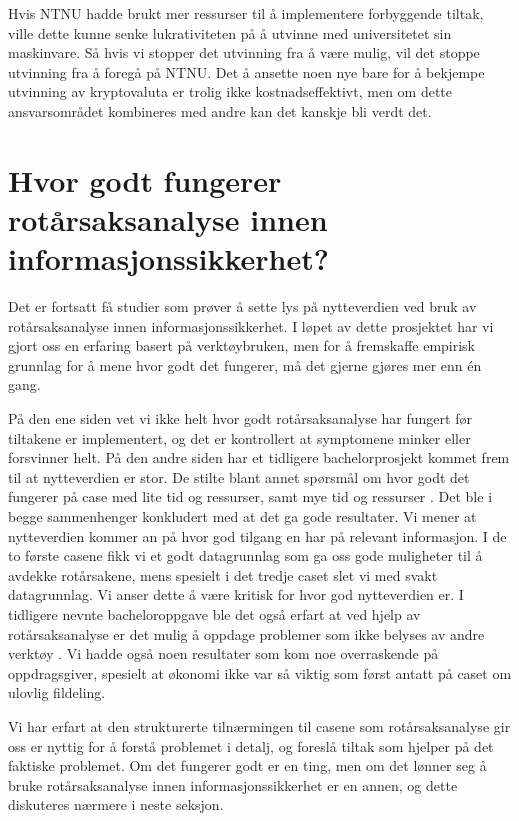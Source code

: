 Hvis NTNU hadde brukt mer ressurser til å implementere forbyggende tiltak, ville dette kunne senke lukrativiteten på å utvinne med universitetet sin maskinvare. Så hvis vi stopper det utvinning fra å være mulig, vil det stoppe utvinning fra å foregå på NTNU. Det å ansette noen nye bare for å bekjempe utvinning av kryptovaluta er trolig ikke kostnadseffektivt, men om dette ansvarsområdet kombineres med andre kan det kanskje bli verdt det.




\section{Hvor godt fungerer rotårsaksanalyse innen informasjonssikkerhet?}
Det er fortsatt få studier som prøver å sette lys på nytteverdien ved bruk av rotårsaksanalyse innen informasjonssikkerhet. I løpet av dette prosjektet har vi gjort oss en erfaring basert på verktøybruken, men for å fremskaffe empirisk grunnlag for å mene hvor godt det fungerer, må det gjerne gjøres mer enn én gang. 

På den ene siden vet vi ikke helt hvor godt rotårsaksanalyse har fungert før tiltakene er implementert, og det er kontrollert at symptomene minker eller forsvinner helt. På den andre siden har et tidligere bachelorprosjekt kommet frem til at nytteverdien er stor. De stilte blant annet spørsmål om hvor godt det fungerer på case med lite tid og ressurser, samt mye tid og ressurser \cite{RCARapport}. Det ble i begge sammenhenger konkludert med at det ga gode resultater. Vi mener at nytteverdien kommer an på hvor god tilgang en har på relevant informasjon. I de to første casene fikk vi et godt datagrunnlag som ga oss gode muligheter til å avdekke rotårsakene, mens spesielt i det tredje caset slet vi med svakt datagrunnlag. Vi anser dette å være kritisk for hvor god nytteverdien er. I tidligere nevnte bacheloroppgave ble det også erfart at ved hjelp av rotårsaksanalyse er det mulig å oppdage problemer som ikke belyses av andre verktøy \cite{RCARapport}. Vi hadde også noen resultater som kom noe overraskende på oppdragsgiver, spesielt at økonomi ikke var så viktig som først antatt på caset om ulovlig fildeling. 

Vi har erfart at den strukturerte tilnærmingen til casene som rotårsaksanalyse gir oss er nyttig for å forstå problemet i detalj, og foreslå tiltak som hjelper på det faktiske problemet. Om det fungerer godt er en ting, men om det lønner seg å bruke rotårsaksanalyse innen informasjonssikkerhet er en annen, og dette diskuteres nærmere i neste seksjon. 


